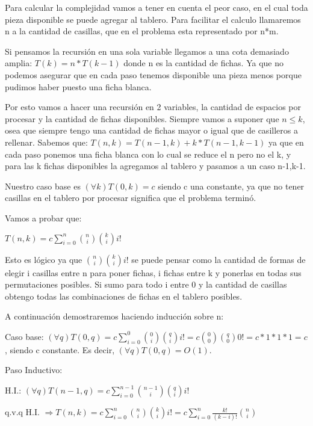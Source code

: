 Para calcular la complejidad vamos a tener en cuenta el peor caso, en el cual toda pieza disponible se puede agregar al tablero. Para facilitar el calculo llamaremos n a la cantidad de casillas, que en el problema esta representado por n*m.

Si pensamos la recursión en una sola variable llegamos a una cota demasiado amplia:
$T(k)=n*T(k-1)$ donde n es la cantidad de fichas. Ya que no podemos asegurar que en cada paso tenemos disponible una pieza menos porque pudimos haber puesto una ficha blanca.

Por esto vamos a hacer una recursión en 2 variables, la cantidad de espacios por procesar y la cantidad de fichas disponibles. Siempre vamos a suponer que $n\leq k$, osea que siempre tengo una cantidad de fichas mayor o igual que de casilleros a rellenar.
Sabemos que: $T(n,k) = T(n-1,k) + k*T(n-1,k-1)$ ya que en cada paso ponemos una ficha blanca con lo cual se reduce el n pero no el k, y para las k fichas disponibles la agregamos al tablero y pasamos a un caso n-1,k-1.

Nuestro caso base es $(\forall k) T(0,k)= c$ siendo c una constante, ya que no tener casillas en el tablero por procesar significa que el problema terminó.


Vamos a probar que:

$T(n,k) = c \sum_{i=0}^{n} \binom{n}{i} \binom{k}{i} i!$

Esto es lógico ya que $\binom{n}{i} \binom{k}{i} i!$ se puede pensar como la cantidad de formas de elegir i casillas entre n para poner fichas, i fichas entre k y ponerlas en todas sus permutaciones posibles. Si sumo para todo i entre 0 y la cantidad de casillas obtengo todas las combinaciones de fichas en el tablero posibles.

A continuación demostraremos haciendo inducción sobre n:

Caso base: $(\forall q)T(0,q)= c \sum_{i=0}^{0} \binom{0}{i} \binom{q}{i} i! = c \binom{0}{0} \binom{q}{0} 0! = c*1*1*1 = c$, siendo c constante. Es decir, $(\forall q)T(0,q)=O(1)$.

Paso Inductivo:

H.I.: $(\forall q)T(n-1,q) = c \sum_{i=0}^{n-1} \binom{n-1}{i} \binom{q}{i} i!$

q.v.q H.I. $\Rightarrow T(n,k) = c \sum_{i=0}^{n} \binom{n}{i} \binom{k}{i} i! = c \sum_{i=0}^{n} \frac{k!}{(k-i)!}\binom{n}{i}$ 

